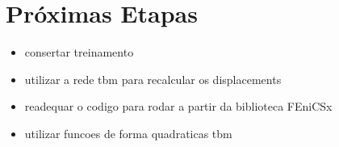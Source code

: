 \section{Próximas Etapas}

\begin{itemize}
    \item consertar treinamento
    \item utilizar a rede tbm para recalcular os displacements
    \item readequar o codigo para rodar a partir da biblioteca FEniCSx
    \item utilizar funcoes de forma quadraticas tbm
\end{itemize}
